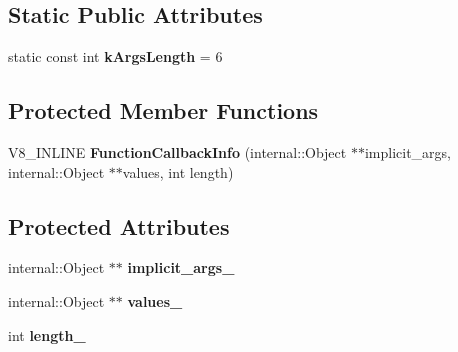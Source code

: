 \subsection*{Static Public Attributes}
\begin{DoxyCompactItemize}
\item 
\mbox{\label{classv8_1_1FunctionCallbackInfo_a1e5248c2d40840270829882feaaa9d34}} 
static const int {\bfseries k\+Args\+Length} = 6
\end{DoxyCompactItemize}
\subsection*{Protected Member Functions}
\begin{DoxyCompactItemize}
\item 
\mbox{\label{classv8_1_1FunctionCallbackInfo_ad479ef760ed88d4354c267d2068deaca}} 
V8\+\_\+\+I\+N\+L\+I\+NE {\bfseries Function\+Callback\+Info} (internal\+::\+Object $\ast$$\ast$implicit\+\_\+args, internal\+::\+Object $\ast$$\ast$values, int length)
\end{DoxyCompactItemize}
\subsection*{Protected Attributes}
\begin{DoxyCompactItemize}
\item 
\mbox{\label{classv8_1_1FunctionCallbackInfo_ab8a2c77ae9ea4f1406c4e488c7cdd700}} 
internal\+::\+Object $\ast$$\ast$ {\bfseries implicit\+\_\+args\+\_\+}
\item 
\mbox{\label{classv8_1_1FunctionCallbackInfo_a21b29295968c0797c9f94ab6c7f571ca}} 
internal\+::\+Object $\ast$$\ast$ {\bfseries values\+\_\+}
\item 
\mbox{\label{classv8_1_1FunctionCallbackInfo_ab250ace06b495beb6f14b192eff77005}} 
int {\bfseries length\+\_\+}
\end{DoxyCompactItemize}
